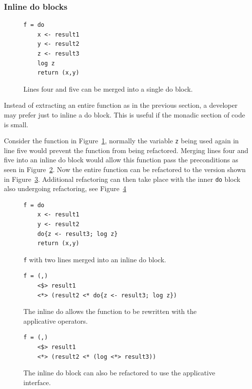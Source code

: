 \subsubsection{Inline do blocks}

\begin{figure}[h]
\begin{lstlisting}
f = do
	x <- result1
	y <- result2
	z <- result3
	log z
	return (x,y)
\end{lstlisting}
\caption{Lines four and five can be merged into a single do block.}
\label{logZFun}
\end{figure}

Instead of extracting an entire function as in the previous section, a developer may prefer just to inline a do block. This is useful if the monadic section of code is small.

Consider the function in Figure~\ref{logZFun}, normally the variable \texttt{z} being used again in line five would prevent the function from being refactored. Merging lines four and five into an inline do block would allow this function pass the preconditions as seen in Figure~\ref{inlineDo}. Now the entire function can be refactored to the version shown in Figure~\ref{inlineDo_ref}. Additional refactoring can then take place with the inner \texttt{do} block also undergoing refactoring, see Figure~\ref{zLog}

\begin{figure}[t]
\begin{lstlisting}
f = do
	x <- result1
	y <- result2
	do{z <- result3; log z}
	return (x,y)
\end{lstlisting}
\caption{\texttt{f} with two lines merged into an inline do block.}
\label{inlineDo}
\end{figure}

\begin{figure}[t]
\begin{lstlisting}
f = (,) 
    <$> result1 
    <*> (result2 <* do{z <- result3; log z})
\end{lstlisting}
\caption{The inline do allows the function to be rewritten with the applicative operators.}
\label{inlineDo_ref}
\end{figure}

\begin{figure}[t]
\begin{lstlisting}
f = (,) 
    <$> result1
    <*> (result2 <* (log <*> result3))
\end{lstlisting}
\caption{The inline do block can also be refactored to use the applicative interface.}
\label{zLog}
\end{figure}

